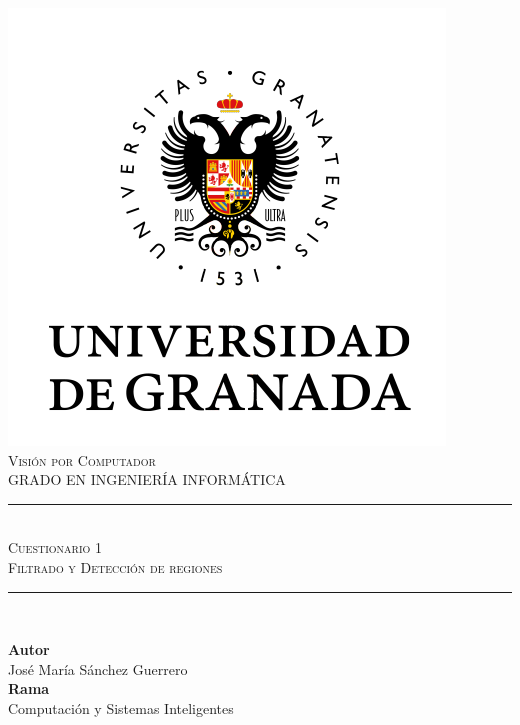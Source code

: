 \documentclass[11pt,a4paper]{article}
\newcommand{\asignatura}{Visión por Computador}
\newcommand{\autor}{José María Sánchez Guerrero}
\newcommand{\titulo}{Cuestionario 1}
\newcommand{\subtitulo}{Filtrado y Detección de regiones}
\begin{document}

\begin{titlepage}

\begin{minipage}{\textwidth}

\centering

\includegraphics[scale=0.5]{img/ugr.png}\\

\textsc{\Large \asignatura{}\\[0.2cm]}
\textsc{GRADO EN INGENIERÍA INFORMÁTICA}\\[1cm]

\noindent\rule[-1ex]{\textwidth}{1pt}\\[1.5ex]
\textsc{{\Huge \titulo\\[0.5ex]}}
\textsc{{\Large \subtitulo\\}}
\noindent\rule[-1ex]{\textwidth}{2pt}\\[3.5ex]

\end{minipage}

\vspace{0.5cm}

\begin{minipage}{\textwidth}

\centering

\textbf{Autor}\\ {\autor{}}\\[2.5ex]
\textbf{Rama}\\ {Computación y Sistemas Inteligentes}\\[2.5ex]
\vspace{0.3cm}


\end{minipage}
\end{titlepage}
\end{document}
